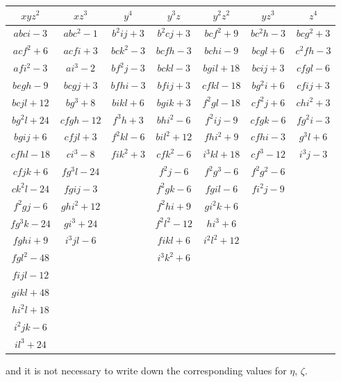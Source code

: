 \documentclass[11pt,a4paper]{book}
\begin{document}
\begin{center}
\begin{center}
\small
\begin{tabular}{|c|c|c|c|c|c|c|}
\hline
$xyz^2$ & $xz^3$ & $y^4$ & $y^3z$ & $y^2z^2$ & $yz^3$ & $z^4$ \\
\hline
$abci - 3$ & $abc^2 - 1$ & $b^2ij + 3$ & $b^2cj + 3$ & $bcf^2 + 9$ & $bc^2h - 3$ & $bcg^2 + 3$ \\
$acf^2 + 6$ & $acfi + 3$ & $bck^2 - 3$ & $bcfh - 3$ & $bchi - 9$ & $bcgl + 6$ & $c^2fh - 3$ \\
$afi^2 - 3$ & $ai^3 - 2$ & $bf^2j - 3$ & $bckl - 3$ & $bgil + 18$ & $bcij + 3$ & $cfgl - 6$ \\
$begh - 9$ & $bcgj + 3$ & $bfhi - 3$ & $bfij + 3$ & $cfkl - 18$ & $bg^2i + 6$ & $cfij + 3$ \\
$bcjl + 12$ & $bg^3 + 8$ & $bikl + 6$ & $bgik + 3$ & $f^2gl - 18$ & $cf^2j + 6$ & $chi^2 + 3$ \\
$bg^2l + 24$ & $cfgh - 12$ & $f^3h + 3$ & $bhi^2 - 6$ & $f^2ij - 9$ & $cfgk - 6$ & $fg^2i - 3$ \\
$bgij + 6$ & $cfjl + 3$ & $f^2kl - 6$ & $bil^2 + 12$ & $fhi^2 + 9$ & $cfhi - 3$ & $g^3l + 6$ \\
$cfhl - 18$ & $ci^3 - 8$ & $fik^2 + 3$ & $cfk^2 - 6$ & $i^3kl + 18$ & $cf^3 - 12$ & $i^3j - 3$ \\
$cfjk + 6$ & $fg^3l - 24$ & & $f^2j - 6$ & $f^2g^3 - 6$ & $f^2g^2 - 6$ & \\
$ck^2l - 24$ & $fgij - 3$ & & $f^2gk - 6$ & $fgil - 6$ & $fi^2j - 9$ & \\
$f^2gj - 6$ & $ghi^2 + 12$ & & $f^2hi + 9$ & $gi^2k + 6$ & & \\
$fg^3k - 24$ & $gi^3 + 24$ & & $f^2l^2 - 12$ & $hi^3 + 6$ & & \\
$fghi + 9$ & $i^3jl - 6$ & & $fikl + 6$ & $i^2l^2 + 12$ & & \\
$fgl^2 - 48$ & & & $i^3k^2 + 6$ & & & \\
$fijl - 12$ & & & & & & \\
$gikl + 48$ & & & & & & \\
$hi^2l + 18$ & & & & & & \\
$i^2jk - 6$ & & & & & & \\
$il^3 + 24$ & & & & & & \\
\hline
\end{tabular}
\end{center}
and it is not necessary to write down the corresponding values for $\eta$, $\zeta$.




\end{center}
\end{document}
